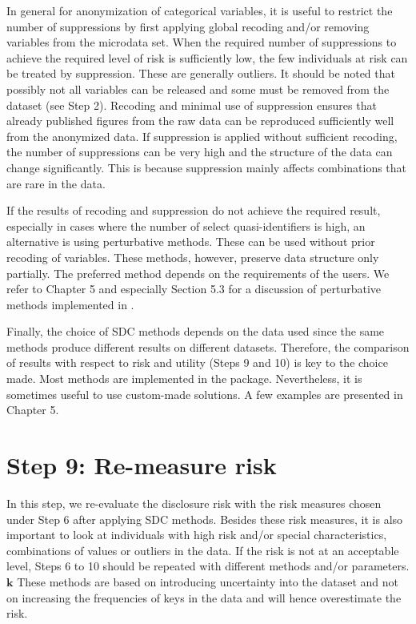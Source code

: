 \documentclass[letterpaper,10pt,english]{sphinxmanual}
\begin{document}
In general for anonymization of categorical variables, it is useful to
restrict the number of suppressions by first applying global recoding
and/or removing variables from the microdata set. When the required
number of suppressions to achieve the required level of risk is
sufficiently low, the few individuals at risk can be treated by
suppression. These are generally outliers. It should be noted that
possibly not all variables can be released and some must be removed from
the dataset (see Step 2). Recoding and minimal use of suppression
ensures that already published figures from the raw data can be
reproduced sufficiently well from the anonymized data. If suppression is
applied without sufficient recoding, the number of suppressions can be
very high and the structure of the data can change significantly. This
is because suppression mainly affects combinations that are rare in the
data.

If the results of recoding and suppression do not achieve the required
result, especially in cases where the number of select quasi-identifiers
is high, an alternative is using perturbative methods. These can be used
without prior recoding of variables. These methods, however, preserve
data structure only partially. The preferred method depends on the
requirements of the users. We refer to Chapter 5 and especially Section
5.3 for a discussion of perturbative methods implemented in .

Finally, the choice of SDC methods depends on the data used since the
same methods produce different results on different datasets. Therefore,
the comparison of results with respect to risk and utility (Steps 9 and
10) is key to the choice made. Most methods are implemented in the
 package. Nevertheless, it is sometimes useful to use
custom-made solutions. A few examples are presented in Chapter 5.


\section{Step 9: Re-measure risk}
\label{\detokenize{process:step-9-re-measure-risk}}
In this step, we re-evaluate the disclosure risk with the risk measures
chosen under Step 6 after applying SDC methods. Besides these risk
measures, it is also important to look at individuals with high risk
and/or special characteristics, combinations of values or outliers in
the data. If the risk is not at an acceptable level, Steps 6 to 10
should be repeated with different methods and/or parameters. \(\mathbf{k}\) These methods are based on
introducing uncertainty into the dataset and not on increasing the
frequencies of keys in the data and will hence overestimate the risk.
\end{document}
